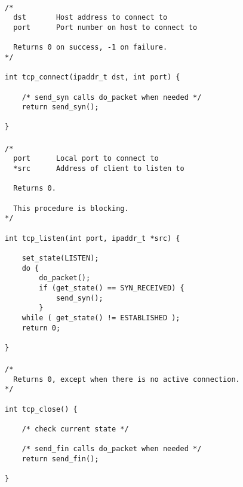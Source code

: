 \documentclass[11pt]{article}
\begin{document}
\paragraph{}


\begin{lstlisting}[title=Procedure tcp\_connect]
/*
  dst       Host address to connect to
  port      Port number on host to connect to

  Returns 0 on success, -1 on failure.
*/

int tcp_connect(ipaddr_t dst, int port) {

    /* send_syn calls do_packet when needed */
    return send_syn();

}
\end{lstlisting}


\paragraph{}


\begin{lstlisting}[title=Procedure tcp\_listen]
/*
  port      Local port to connect to
  *src      Address of client to listen to

  Returns 0.

  This procedure is blocking.
*/

int tcp_listen(int port, ipaddr_t *src) {

    set_state(LISTEN);
    do {
        do_packet();
        if (get_state() == SYN_RECEIVED) {
            send_syn();
        }
    while ( get_state() != ESTABLISHED );
    return 0;

}
\end{lstlisting}


\paragraph{}


\begin{lstlisting}[title=Procedure tcp\_close]
/*
  Returns 0, except when there is no active connection.
*/

int tcp_close() {

    /* check current state */

    /* send_fin calls do_packet when needed */
    return send_fin();

}
\end{lstlisting}


\paragraph{}
\end{document}
